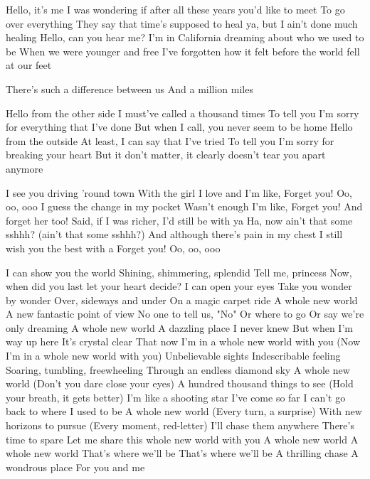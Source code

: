 
Hello, it's me
I was wondering if after all these years you'd like to meet
To go over everything
They say that time's supposed to heal ya, but I ain't done much healing
Hello, can you hear me?
I'm in California dreaming about who we used to be
When we were younger and free
I've forgotten how it felt before the world fell at our feet

There's such a difference between us
And a million miles

Hello from the other side
I must've called a thousand times
To tell you I'm sorry for everything that I've done
But when I call, you never seem to be home
Hello from the outside
At least, I can say that I've tried
To tell you I'm sorry for breaking your heart
But it don't matter, it clearly doesn't tear you apart anymore


I see you driving 'round town
With the girl I love and I'm like,
Forget you!
Oo, oo, ooo
I guess the change in my pocket
Wasn't enough I'm like,
Forget you!
And forget her too!
Said, if I was richer, I'd still be with ya
Ha, now ain't that some sshhh? (ain't that some sshhh?)
And although there's pain in my chest
I still wish you the best with a
Forget you!
Oo, oo, ooo

I can show you the world
Shining, shimmering, splendid
Tell me, princess
Now, when did you last let your heart decide?
I can open your eyes
Take you wonder by wonder
Over, sideways and under
On a magic carpet ride
A whole new world
A new fantastic point of view
No one to tell us, "No"
Or where to go
Or say we're only dreaming
A whole new world
A dazzling place I never knew
But when I'm way up here
It's crystal clear
That now I'm in a whole new world with you
(Now I'm in a whole new world with you)
Unbelievable sights
Indescribable feeling
Soaring, tumbling, freewheeling
Through an endless diamond sky
A whole new world
(Don't you dare close your eyes)
A hundred thousand things to see
(Hold your breath, it gets better)
I'm like a shooting star
I've come so far
I can't go back to where I used to be
A whole new world
(Every turn, a surprise)
With new horizons to pursue
(Every moment, red-letter)
I'll chase them anywhere
There's time to spare
Let me share this whole new world with you
A whole new world
A whole new world
That's where we'll be
That's where we'll be
A thrilling chase
A wondrous place
For you and me
